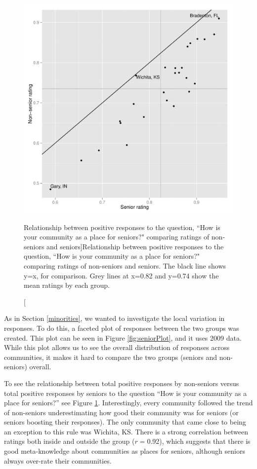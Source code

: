 \documentclass[smallextended]{svjour3}\usepackage[]{graphicx}\usepackage[]{color}
\newenvironment{knitrout}{}{} %
\begin{document}
\begin{knitrout}
\color{fgcolor}\begin{figure}

{\centering \includegraphics[width=0.76\linewidth]{figure/anotherlookseniors-1} 

}

\caption[Relationship between positive responses to the question, ``How is your community as a place for seniors?" comparing ratings of non-seniors and seniors]{Relationship between positive responses to the question, ``How is your community as a place for seniors?" comparing ratings of non-seniors and seniors. The black line shows y=x, for comparison. Grey lines at x=0.82 and y=0.74 show the mean ratings by each group.}\label{fig:anotherlookseniors}
\end{figure}


\end{knitrout}

As in Section \ref{minorities}, we wanted to investigate the local variation in responses. To do this, a faceted plot of responses between the two groups was created. This plot can be seen in Figure \ref{fig:seniorPlot}, and it uses 2009 data. While this plot allows us to see the overall distribution of responses across communities, it makes it hard to compare the two groups (seniors and non-seniors) overall.

To see the relationship between total positive responses by non-seniors versus total positive responses by seniors to the question ``How is your community as a place for seniors?'' see Figure \ref{fig:anotherlookseniors}. Interestingly, every community followed the trend of non-seniors underestimating how good their community was for seniors (or seniors boosting their responses). The only community that came close to being an exception to this rule was Wichita, KS. There is a strong correlation between ratings both inside and outside the group ($r=$0.92), which suggests that there is good meta-knowledge about communities as places for seniors, although seniors always over-rate their communities. 
\end{document}
